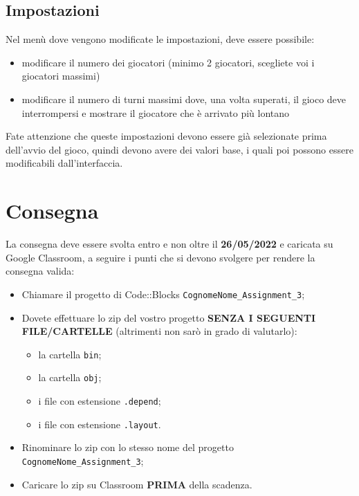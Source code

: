 \documentclass[addpoints]{exam}
\begin{document}
    \subsection{Impostazioni}
    \label{settings}
    Nel menù dove vengono modificate le impostazioni, deve essere possibile: 
    \begin{itemize}
        \item modificare il numero dei giocatori (minimo 2 giocatori, scegliete voi i giocatori massimi)
        \item modificare il numero di turni massimi dove, una volta superati, il gioco deve interrompersi e mostrare il giocatore che è arrivato più lontano
    \end{itemize}

    Fate attenzione che queste impostazioni devono essere già selezionate prima dell'avvio del gioco, quindi devono avere dei valori base, i quali poi possono essere modificabili dall'interfaccia.

    \clearpage

    \section{Consegna}
    \label{consegna}
    La consegna deve essere svolta entro e non oltre il \textbf{26/05/2022} e caricata su Google Classroom, a seguire i punti che si devono svolgere per rendere la consegna valida:
    \begin{itemize}
        \item Chiamare il progetto di Code::Blocks \texttt{CognomeNome\_Assignment\_3};
        \item Dovete effettuare lo zip del vostro progetto \textbf{SENZA I SEGUENTI FILE/CARTELLE} (altrimenti non sarò in grado di valutarlo): 
        \begin{itemize}
            \item la cartella \texttt{bin};
            \item la cartella \texttt{obj};
            \item i file con estensione \texttt{.depend};
            \item i file con estensione \texttt{.layout}.
        \end{itemize}
        \item Rinominare lo zip con lo stesso nome del progetto \texttt{CognomeNome\_Assignment\_3};
        \item Caricare lo zip su Classroom \textbf{PRIMA} della scadenza.
    \end{itemize}
    
\end{document}
